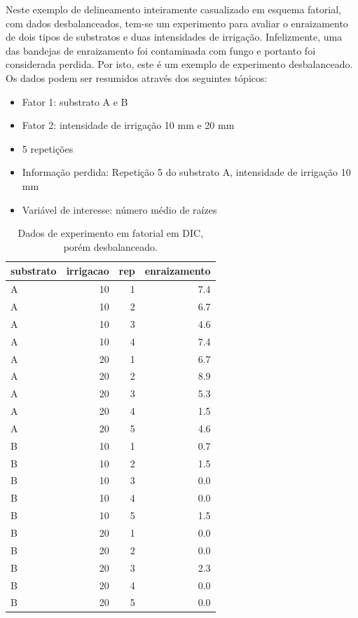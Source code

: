 \documentclass[
]{article}
\providecommand{\tightlist}{%
  \setlength{\itemsep}{0pt}\setlength{\parskip}{0pt}}
\begin{document}
Neste exemplo de delineamento inteiramente casualizado em esquema fatorial, com dados desbalanceados, tem-se um experimento para avaliar o enraizamento de dois tipos de substratos e duas intensidades de irrigação. Infelizmente, uma das bandejas de enraizamento foi contaminada com fungo e portanto foi considerada perdida. Por isto, este é um exemplo de experimento desbalanceado. Os dados podem ser resumidos através dos seguintes tópicos:

\begin{itemize}
\tightlist
\item
  Fator 1: substrato A e B
\item
  Fator 2: intensidade de irrigação 10 mm e 20 mm
\item
  5 repetições
\item
  Informação perdida: Repetição 5 do substrato A, intensidade de irrigação 10 mm
\item
  Variável de interesse: número médio de raízes
\end{itemize}

\begin{table}

\caption{\label{tab:unnamed-chunk-93}Dados de experimento em fatorial em DIC, porém desbalanceado.}
\centering
\begin{tabular}[t]{l|r|r|r}
\hline
substrato & irrigacao & rep & enraizamento\\
\hline
A & 10 & 1 & 7.4\\
\hline
A & 10 & 2 & 6.7\\
\hline
A & 10 & 3 & 4.6\\
\hline
A & 10 & 4 & 7.4\\
\hline
A & 20 & 1 & 6.7\\
\hline
A & 20 & 2 & 8.9\\
\hline
A & 20 & 3 & 5.3\\
\hline
A & 20 & 4 & 1.5\\
\hline
A & 20 & 5 & 4.6\\
\hline
B & 10 & 1 & 0.7\\
\hline
B & 10 & 2 & 1.5\\
\hline
B & 10 & 3 & 0.0\\
\hline
B & 10 & 4 & 0.0\\
\hline
B & 10 & 5 & 1.5\\
\hline
B & 20 & 1 & 0.0\\
\hline
B & 20 & 2 & 0.0\\
\hline
B & 20 & 3 & 2.3\\
\hline
B & 20 & 4 & 0.0\\
\hline
B & 20 & 5 & 0.0\\
\hline
\end{tabular}
\end{table}
\end{document}
